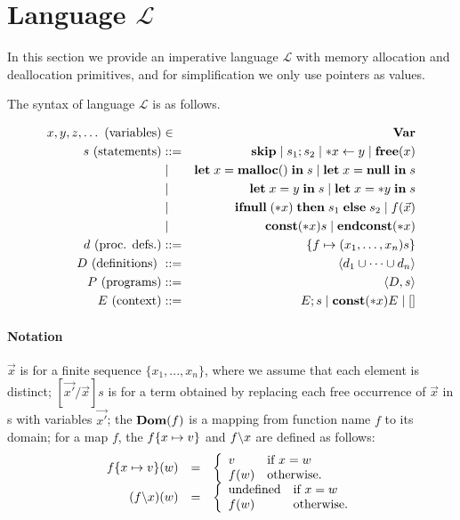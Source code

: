 \section{Language \(\mathcal{L}\)}\label{sec:language}
In this section we provide an imperative language \(\mathcal{L}\) with
memory allocation and deallocation primitives, and for simplification
we only use pointers as values.

The syntax of language \(\mathcal{L}\) is as follows.

\begin{eqnarray*}
  x,y,z,\dots \mbox{ (variables)} &\in& \mathbf{Var}\\
  s \mbox{ (statements)} & ::= &  \mathbf{skip} \mid s_{1};s_{2} \mid *x \leftarrow y \mid \mathbf{free}(x) \\
  & \mid & \mathbf{let}\; x = \mathbf{malloc()}\; \mathbf{in}\; s \mid \mathbf{let}\; x = \mathbf{null}\ \mathbf{in}\; s  \\
  & \mid & \mathbf{let}\; x = y \; \mathbf{in}\; s \mid   \mathbf{let}\; x = *y \; \mathbf{in}\; s \\
  & \mid & \mathbf{ifnull}\;(*x) \; \mathbf{then}\; s_{1}\; \mathbf{else}\; s_{2} \mid f(\vec{x})\\
  & \mid & \mathbf{const}(*x) s \mid \mathbf{endconst}(*x)  \\
  d \mbox{ (proc. defs.)} & ::= & \{f \mapsto (x_1,\dots,x_n)s\}\\
  D \mbox{ (definitions) } &::=& \langle d_1 \cup \dots \cup d_n \rangle\\
  P \mbox{ (programs)} &::=& \langle D, s \rangle\\
  E \mbox{ (context)} &::=& E;s \mid \mathbf{const}(*x) E \mid [ ] 
\end{eqnarray*}

\paragraph{Notation} \(\vec{x}\) is for a finite sequence \(\{x_1,...,x_n\}\),
where we assume that each element is distinct; \([\vec{x'}/\vec{x}]s\)
is for a term obtained by replacing each free occurrence of
\(\vec{x}\) in s with variables \(\vec{x'}\); the \(\mathbf{Dom}(f)\) is a
mapping from function name \(f\) to its domain; for a map \(f\), the
\(f \{x \mapsto v\}\) and \( f \backslash x\) are defined as follows:
\[
\begin{array}{rcl}
f \{x \mapsto v\} (w) &=&
\left\{
\begin{array}{ll}
v & \mbox{if \(x = w\)}\\
f(w) & \mbox{otherwise.}
\end{array}
\right.\\
(f \backslash x)(w) &=&
\left\{
\begin{array}{ll}
\mbox{undefined} & \mbox{if \(x = w\)}\\
f(w) & \mbox{otherwise.}
\end{array}
\right.
\end{array}
\]

